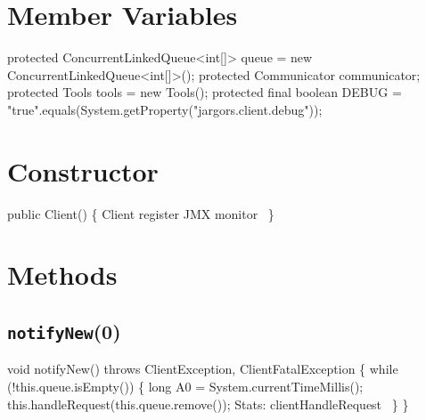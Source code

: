\section{Member Variables}
\nwenddocs{}\endmoddef{}
protected ConcurrentLinkedQueue<int[]> queue = new ConcurrentLinkedQueue<int[]>();
protected Communicator communicator;
protected Tools tools = new Tools();
protected final boolean DEBUG =
    "true".equals(System.getProperty("jargors.client.debug"));
\nwendcode{}\nwdocspar
\section{Constructor}
\nwenddocs{}\endmoddef{}
public Client() \{
  \LA{}\code{}Client\edoc{} register JMX monitor~{\nwtagstyle{}}\RA{}
\}
\nwendcode{}\nwdocspar

\section{Methods}

\subsection{\texttt{notifyNew}(0)}
\nwenddocs{}\endmoddef{}
void notifyNew() throws ClientException, ClientFatalException \{
  while (!this.queue.isEmpty()) \{
    long A0 = System.currentTimeMillis();
    this.handleRequest(this.queue.remove());
    \LA{}Stats: clientHandleRequest~{\nwtagstyle{}}\RA{}
  \}
\}
\eatline
{}\nwendcode{}\nwdocspar
